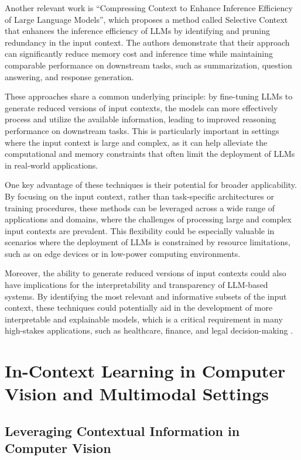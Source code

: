 \documentclass[11pt]{article}
\begin{document}
Another relevant work is ``Compressing Context to Enhance Inference Efficiency of Large Language Models'', which proposes a method called Selective Context that enhances the inference efficiency of LLMs by identifying and pruning redundancy in the input context. The authors demonstrate that their approach can significantly reduce memory cost and inference time while maintaining comparable performance on downstream tasks, such as summarization, question answering, and response generation.

These approaches share a common underlying principle: by fine-tuning LLMs to generate reduced versions of input contexts, the models can more effectively process and utilize the available information, leading to improved reasoning performance on downstream tasks. This is particularly important in settings where the input context is large and complex, as it can help alleviate the computational and memory constraints that often limit the deployment of LLMs in real-world applications.

One key advantage of these techniques is their potential for broader applicability. By focusing on the input context, rather than task-specific architectures or training procedures, these methods can be leveraged across a wide range of applications and domains, where the challenges of processing large and complex input contexts are prevalent. This flexibility could be especially valuable in scenarios where the deployment of LLMs is constrained by resource limitations, such as on edge devices or in low-power computing environments.

Moreover, the ability to generate reduced versions of input contexts could also have implications for the interpretability and transparency of LLM-based systems. By identifying the most relevant and informative subsets of the input context, these techniques could potentially aid in the development of more interpretable and explainable models, which is a critical requirement in many high-stakes applications, such as healthcare, finance, and legal decision-making \cite{ref230}.

\section{In-Context Learning in Computer Vision and Multimodal Settings}

\subsection{Leveraging Contextual Information in Computer Vision}
\end{document}
